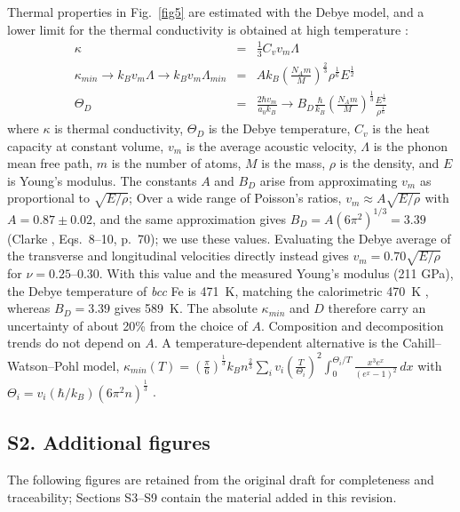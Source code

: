 \documentclass[final,3p,times]{elsarticle}
\begin{document}
Thermal properties in Fig.~\ref{fig5} are estimated with the Debye model, and a lower limit for the thermal conductivity is obtained at high temperature \cite{clarke2003materialsselection,clarke2003materialsdesign}:
\begin{eqnarray}
    \kappa &=& \frac{1}{3} C_v v_m \Lambda \\
    \kappa_{min} \rightarrow k_B v_m \Lambda \rightarrow k_B v_m \Lambda_{min} &=& A k_B \left(\frac{N_A m}{M}\right)^{\frac{2}{3}} \rho^{\frac{1}{6}} E^{\frac{1}{2}} \\
    \Theta_D &=& \frac{2\hbar v_m}{a_0 k_B} \rightarrow B_D \frac{\hbar}{k_B} \left(\frac{N_A m}{M}\right)^{\frac{1}{3}} \frac{E^{\frac{1}{2}} }{\rho^{\frac{1}{6}}}
\end{eqnarray}
where $\kappa$ is thermal conductivity, $\Theta_D$ is the Debye temperature, $C_v$ is the heat capacity at constant volume, $v_m$ is the average acoustic velocity, $\Lambda$ is the phonon mean free path, $m$ is the number of atoms, $M$ is the mass, $\rho$ is the density, and $E$ is Young's modulus. The constants $A$ and $B_D$ arise from approximating $v_m$ as proportional to $\sqrt{E/\rho}$; Over a wide range of Poisson's ratios, $v_m\approx A\sqrt{E/\rho}$ with $A=0.87\pm0.02$, and the same approximation gives $B_D=A(6\pi^2)^{1/3}=3.39$ (Clarke \cite{clarke2003materialsselection}, Eqs.~8--10, p.~70); we use these values. Evaluating the Debye average of the transverse and longitudinal velocities directly instead gives $v_m=0.70\sqrt{E/\rho}$ for $\nu=0.25$--0.30. With this value and the measured Young's modulus (211 GPa), the Debye temperature of \textit{bcc} Fe is 471~K, matching the calorimetric 470~K \cite{kittel2005introduction}, whereas $B_D=3.39$ gives 589~K. The absolute $\kappa_{min}$ and $D$ therefore carry an uncertainty of about 20\% from the choice of $A$. Composition and decomposition trends do not depend on $A$. A temperature-dependent alternative is the Cahill--Watson--Pohl model, $\kappa_{min} (T) = (\frac{\pi}{6})^{\frac{1}{3}} k_B n^{\frac{2}{3}} \sum_{i} v_i (\frac{T}{\Theta_i})^2 \int_{0}^{\Theta_i/T} \frac{x^3 e^x}{(e^x -1)^2}\,dx$ with $\Theta_i = v_i (\hbar/k_B) (6\pi^2n)^{\frac{1}{3}}$ \cite{cahill1992lower}.

\subsection*{S2. Additional figures}
The following figures are retained from the original draft for completeness and traceability; Sections S3--S9 contain the material added in this revision.
\end{document}
